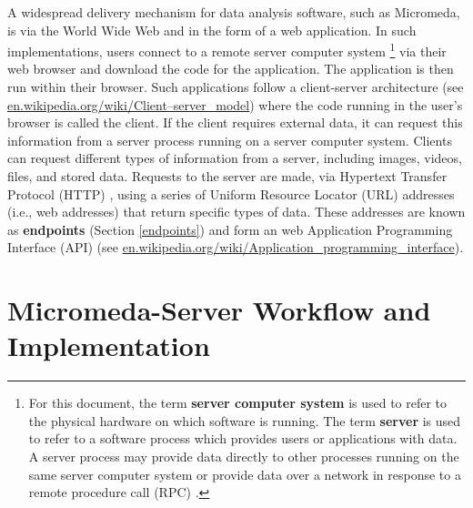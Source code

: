 A widespread delivery mechanism for data analysis software, such as Micromeda, is via the World Wide Web \cite{berners1994world} and in the form of a web application. In such implementations, users connect to a remote server computer system \footnote{For this document, the term \textbf{server computer system} is used to refer to the physical hardware on which software is running. The term \textbf{server} is used to refer to a software process which provides users or applications with data. A server process may provide data directly to other processes running on the same server computer system or provide data over a network in response to a remote procedure call (RPC) \cite{nelson1981remote}.} via their web browser and download the code for the application. The application is then run within their browser. Such applications follow a client-server architecture \cite{svobodova1985client} (see \href{en.wikipedia.org/wiki/Client–server\_model}{en.wikipedia.org/wiki/Client–server\_model}) where the code running in the user's browser is called the client. If the client requires external data, it can request this information from a server process running on a server computer system. Clients can request different types of information from a server, including images, videos, files, and stored data. Requests to the server are made, via Hypertext Transfer Protocol (HTTP) \cite{fielding1999hypertext}, using a series of Uniform Resource Locator (URL) addresses \cite{berners1994rfc} (i.e., web addresses) that return specific types of data. These addresses are known as \textbf{endpoints} (Section \ref{endpoints}) and form an web Application Programming Interface (API) (see \href{en.wikipedia.org/wiki/Application\_programming\_interface}{en.wikipedia.org/wiki/Application\_programming\_interface}).

\section{Micromeda-Server Workflow and Implementation} \label{server-workflow}

